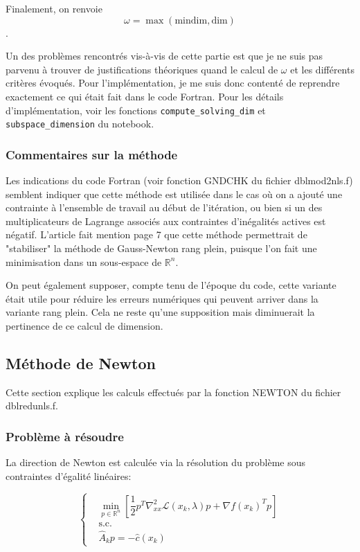 \documentclass[a4paper,11pt]{article}
\newcommand{\real}{\mathbb{R}}
\newcommand{\ha}{\hat{A}}
\numberwithin{equation}{section}
\begin{document}
Finalement, on renvoie
$$\omega = \max(\text{mindim},\text{dim})$$.
 
 
Un des problèmes rencontrés vis-à-vis de cette partie est que je ne suis pas parvenu à trouver de justifications théoriques quand le calcul de $\omega$ et les différents critères évoqués. Pour l'implémentation, je me suis donc contenté de reprendre exactement ce qui était fait dans le code Fortran. Pour les détails d'implémentation, voir les fonctions \texttt{compute\_solving\_dim} et \texttt{subspace\_dimension} du notebook.


\subsubsection{Commentaires sur la méthode}

Les indications du code Fortran (voir fonction GNDCHK du fichier dblmod2nls.f) semblent indiquer que cette méthode est utilisée dans le cas où on a ajouté une contrainte à l'ensemble de travail au début de l'itération, ou bien si un des multiplicateurs de Lagrange associés aux contraintes d'inégalités actives est négatif. L'article \cite{lindstromwedin1988} fait mention page 7 que cette méthode permettrait de "stabiliser" la méthode de Gauss-Newton rang plein, puisque l'on fait une minimisation dans un sous-espace de $\real^{n}$. 

On peut également supposer, compte tenu de l'époque du code, cette variante était utile pour réduire les erreurs numériques qui peuvent arriver dans la variante rang plein. Cela ne reste qu'une supposition mais diminuerait la pertinence de ce calcul de dimension.


\subsection{Méthode de Newton} \label{newtonmethod}

Cette section explique les calculs effectués par la fonction NEWTON du fichier dblredunls.f.
\subsubsection{Problème à résoudre}

La direction de Newton est calculée via la résolution du problème sous contraintes d'égalité linéaires:

$$
\left\{ \begin{aligned}
&\underset{p \in \real^{n}}{\min}\left[ \dfrac{1}{2}p^{T}\nabla_{xx}^{2}\mathcal{L}(x_{k},\lambda)p + \nabla f(x_{k})^{T}p\right]\\
&\text{s.c.}\\
&\ha_{k} p = -\hat{c}(x_{k})
\end{aligned} \right.
$$
\end{document}

